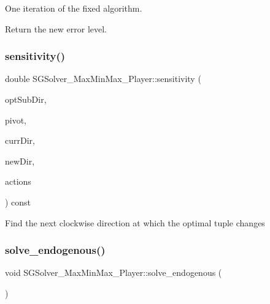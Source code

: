 One iteration of the fixed algorithm. 

Return the new error level. \mbox{\label{classSGSolver__MaxMinMax__3Player_ae7a03c10161b8e5616b648465d039f6c}} 
\subsubsection{\texorpdfstring{sensitivity()}{sensitivity()}}
{\footnotesize\ttfamily double S\+G\+Solver\+\_\+\+Max\+Min\+Max\+\_\+Player\+::sensitivity (\begin{DoxyParamCaption}\item[{\hyperlink{classSGPoint}{S\+G\+Point} \&}]{opt\+Sub\+Dir,  }\item[{const \hyperlink{classSGTuple}{S\+G\+Tuple} \&}]{pivot,  }\item[{const \hyperlink{classSGPoint}{S\+G\+Point} \&}]{curr\+Dir,  }\item[{const \hyperlink{classSGPoint}{S\+G\+Point} \&}]{new\+Dir,  }\item[{const vector$<$ list$<$ \hyperlink{classSGAction__MaxMinMax}{S\+G\+Action\+\_\+\+Max\+Min\+Max} $>$ $>$ \&}]{actions }\end{DoxyParamCaption}) const}

Find the next clockwise direction at which the optimal tuple changes \mbox{\label{classSGSolver__MaxMinMax__3Player_a6b97fe646fe06e3ca384496e592a1b1a}} 
\subsubsection{\texorpdfstring{solve\+\_\+endogenous()}{solve\_endogenous()}}
{\footnotesize\ttfamily void S\+G\+Solver\+\_\+\+Max\+Min\+Max\+\_\+Player\+::solve\+\_\+endogenous (\begin{DoxyParamCaption}{ }\end{DoxyParamCaption})}



